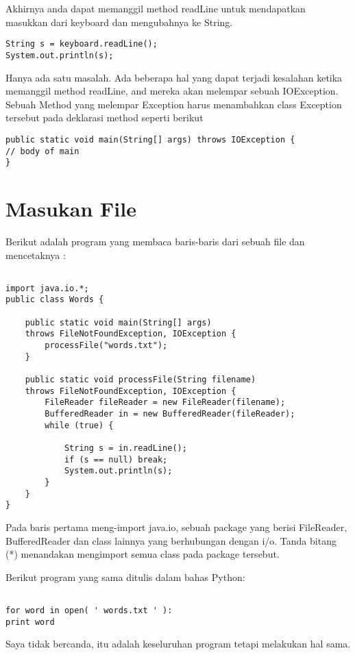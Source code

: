 Akhirnya anda dapat memanggil method readLine untuk mendapatkan masukkan dari keyboard dan mengubahnya ke String.
\begin{lstlisting}
String s = keyboard.readLine();
System.out.println(s);
\end{lstlisting}

Hanya ada satu masalah. Ada beberapa hal yang dapat terjadi kesalahan ketika memanggil method readLine, and mereka akan melempar sebuah IOException. Sebuah Method yang melempar Exception harus menambahkan class Exception tersebut pada deklarasi method seperti berikut

\begin{lstlisting}
public static void main(String[] args) throws IOException {
// body of main
}
\end{lstlisting}

\section{Masukan File}

Berikut adalah program yang membaca baris-baris dari sebuah file dan mencetaknya :

\begin{lstlisting}

import java.io.*;
public class Words {

	public static void main(String[] args)
	throws FileNotFoundException, IOException {
		processFile("words.txt");
	}
	
	public static void processFile(String filename)
	throws FileNotFoundException, IOException {
		FileReader fileReader = new FileReader(filename);
		BufferedReader in = new BufferedReader(fileReader);
		while (true) {

			String s = in.readLine();
			if (s == null) break;
			System.out.println(s);
		}
	}
}

\end{lstlisting}

Pada baris pertama meng-import java.io, sebuah package yang berisi FileReader, BufferedReader dan class lainnya yang berhubungan dengan i/o. Tanda bitang (*) menandakan mengimport semua class pada package tersebut.


Berikut program yang sama ditulis dalam bahas Python:

\begin{lstlisting}

for word in open( ' words.txt ' ):
print word

\end{lstlisting}

Saya tidak bercanda, itu adalah keseluruhan program tetapi melakukan hal sama.